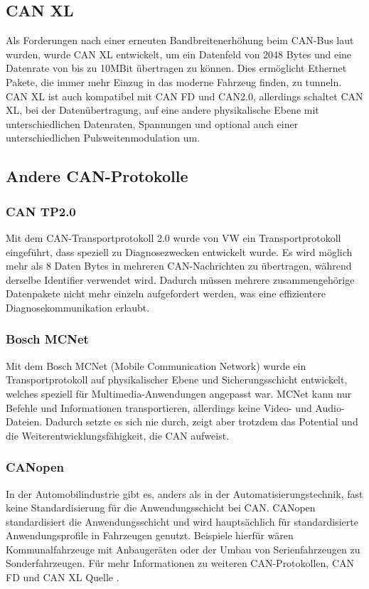     \subsection{CAN XL}
    Als Forderungen nach einer erneuten Bandbreitenerhöhung beim CAN-Bus laut wurden, wurde CAN XL entwickelt, um ein Datenfeld von 2048 Bytes und eine Datenrate von bis zu 10MBit übertragen zu können.
    Dies ermöglicht Ethernet Pakete, die immer mehr Einzug in das moderne Fahrzeug finden, zu tunneln.
    CAN XL ist auch kompatibel mit CAN FD und CAN2.0, allerdings schaltet CAN XL, bei der Datenübertragung, auf eine andere physikalische Ebene mit unterschiedlichen Datenraten, Spannungen und optional auch einer unterschiedlichen Pulsweitenmodulation um. 

    \subsection{Andere CAN-Protokolle}
        \subsubsection{CAN TP2.0}
        Mit dem CAN-Transportprotokoll 2.0 wurde von VW ein Transportprotokoll eingeführt, dass speziell zu Diagnosezwecken entwickelt wurde.
        Es wird möglich mehr als 8 Daten Bytes in mehreren CAN-Nachrichten zu übertragen, während derselbe Identifier verwendet wird.
        Dadurch müssen mehrere zusammengehörige Datenpakete nicht mehr einzeln aufgefordert werden, was eine effizientere Diagnosekommunikation erlaubt. 

        \subsubsection{Bosch MCNet}
        Mit dem Bosch MCNet (Mobile Communication Network) wurde ein Transportprotokoll auf physikalischer Ebene und Sicherungsschicht entwickelt, welches speziell für Multimedia-Anwendungen angepasst war.
        MCNet kann nur Befehle und Informationen transportieren, allerdings keine Video- und Audio-Dateien.
        Dadurch setzte es sich nie durch, zeigt aber trotzdem das Potential und die Weiterentwicklungsfähigkeit, die CAN aufweist.  
        
        \subsubsection{CANopen}
        In der Automobilindustrie gibt es, anders als in der Automatisierungstechnik, fast keine Standardisierung für die Anwendungsschicht bei CAN.
        CANopen standardisiert die Anwendungsschicht und wird hauptsächlich für standardisierte Anwendungsprofile in Fahrzeugen genutzt.
        Beispiele hierfür wären Kommunalfahrzeuge mit Anbaugeräten oder der Umbau von Serienfahrzeugen zu Sonderfahrzeugen. 
        \newline\newline
        Für mehr Informationen zu weiteren CAN-Protokollen, CAN FD und CAN XL Quelle \cite{KIA2022}.